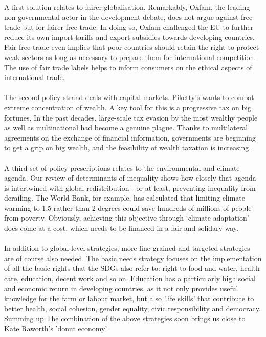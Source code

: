 \documentclass[../summary.tex]{subfiles}
\begin{document}
	A first solution relates to fairer globalisation. Remarkably, Oxfam, the leading non-governmental actor in the development debate, does not argue against free trade but for fairer free trade. In doing so, Oxfam challenged the EU to further reduce its own import tariffs and export subsidies towards developing countries. Fair free trade even implies that poor countries should retain the right to protect weak sectors as long as necessary to prepare them for international competition. The use of fair trade labels helps to inform consumers on the ethical aspects of international trade. 
	\\\\
	The second policy strand deals with capital markets. Piketty's wants to combat extreme concentration of wealth. A key tool for this is a progressive tax on big fortunes. In the past decades, large-scale tax evasion by the most wealthy people as well as multinational had become a genuine plague. Thanks to multilateral agreements on the exchange of financial information, governments are beginning to get a grip on big wealth, and the feasibility of wealth taxation is increasing.
	\\\\
	A third set of policy prescriptions relates to the environmental and climate agenda. Our review of determinants of inequality shows how closely that agenda is intertwined with global redistribution - or at least, preventing inequality from derailing. The World Bank, for example, has calculated that limiting climate warming to 1.5 rather than 2 degrees could save hundreds of millions of people from poverty. Obviously, achieving this objective through ‘climate adaptation’ does come at a cost, which needs to be financed in a fair and solidary way.
	\\\\
	In addition to global-level strategies, more fine-grained and targeted strategies are of course also needed. The basic needs strategy focuses on the implementation of all the basic rights that the SDGs also refer to: right to food and water, health care, education, decent work and so on. Education has a particularly high social and economic return in developing countries, as it not only provides useful knowledge for the farm or labour market, but also 'life skills' that contribute to better health, social cohesion, gender equality, civic responsibility and democracy. Summing up The combination of the above strategies soon brings us close to Kate Raworth's 'donut economy'.
	
\end{document}
